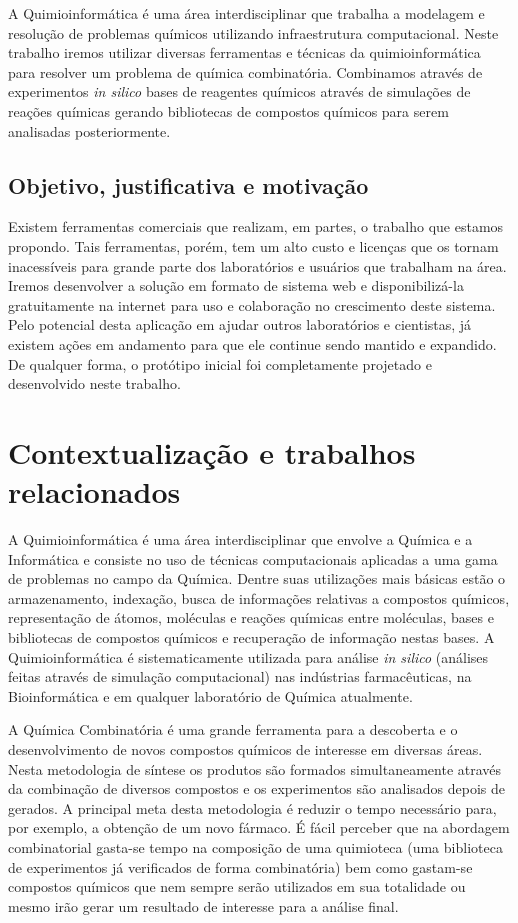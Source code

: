 \documentclass{abnt}
\begin{document}
A Quimioinformática é uma área interdisciplinar que trabalha a modelagem e resolução
de problemas químicos utilizando infraestrutura computacional. Neste trabalho iremos
utilizar diversas ferramentas e técnicas da quimioinformática para resolver um problema
de química combinatória. Combinamos através de experimentos \textit{in silico} bases de
reagentes químicos através de simulações de reações químicas gerando bibliotecas
de compostos químicos para serem analisadas posteriormente.

\section{Objetivo, justificativa e motivação}

Existem ferramentas comerciais que realizam, em partes, o trabalho que estamos propondo.
Tais ferramentas, porém, tem um alto custo e licenças que os tornam inacessíveis
para grande parte dos laboratórios e usuários que trabalham na área. Iremos desenvolver
a solução em formato de sistema web e disponibilizá-la gratuitamente na internet
para uso e colaboração no crescimento deste sistema. Pelo potencial desta aplicação
em ajudar outros laboratórios e cientistas, já existem ações em andamento para que
ele continue sendo mantido e expandido. De qualquer forma, o protótipo inicial foi
completamente projetado e desenvolvido neste trabalho.

\chapter{Contextualização e trabalhos relacionados}

A Quimioinformática\cite{brown1998chemoinformatics} é uma área interdisciplinar que envolve a Química e a Informática
e consiste no uso de técnicas computacionais aplicadas a uma gama de problemas no
campo da Química. Dentre suas utilizações mais básicas estão o armazenamento, indexação,
busca de informações relativas a compostos químicos, representação de átomos, moléculas
e reações químicas entre moléculas, bases e bibliotecas de compostos químicos e
recuperação de informação nestas bases. A Quimioinformática é sistematicamente utilizada
para análise \textit{in silico} (análises feitas através de simulação computacional) nas
indústrias farmacêuticas, na Bioinformática e em qualquer laboratório de Química
atualmente.

A Química Combinatória\cite{RBCF43904} é uma grande ferramenta para a descoberta e o desenvolvimento
de novos compostos químicos de interesse em diversas áreas. Nesta metodologia de
síntese os produtos são formados simultaneamente através da combinação de diversos
compostos e os experimentos são analisados depois de gerados. A principal meta desta
metodologia é reduzir o tempo necessário para, por exemplo, a obtenção de um novo
fármaco. É fácil perceber que na abordagem combinatorial gasta-se tempo na composição
de uma quimioteca (uma biblioteca de experimentos já verificados de forma combinatória)
bem como gastam-se compostos químicos que nem sempre serão utilizados em sua totalidade
ou mesmo irão gerar um resultado de interesse para a análise final.
\end{document}
